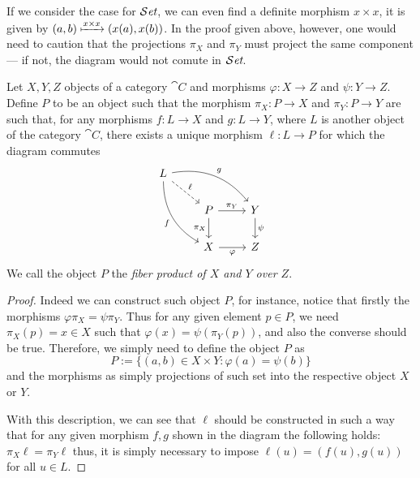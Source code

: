 If we consider the case for \({\mathcal{S}\textit{et}}\), we can even find a definite morphism \(x
\times x\), it is given by \((a, b) \xmapsto{x \times x} (x(a), x(b))\). In the
proof given above, however, one would need to caution that the projections
\(\pi_X\) and \(\pi_Y\) must project the same component --- if not, the diagram
would not comute in \({\mathcal{S}\textit{et}}\).

\begin{proposition}
   Let \(X, Y, Z\) objects of a category \(\cat C\) and morphisms \(\varphi :X
   \to Z\) and \(\psi : Y \to Z\). Define \(P\) to be an object such that the
   morphism  \(\pi_X : P \to X\) and  \(\pi_Y : P \to Y\) are such that, for any
   morphisms \(f : L \to X\) and  \(g : L \to Y\), where \(L\) is another object
   of the category \(\cat C\), there exists a unique morphism \(\ell: L \to P\)
   for which the diagram commutes
   \[
     \begin{tikzcd}
       L
       \ar[dr, dashed, "\ell"]
       \ar[drr, bend left, "g"]
       \ar[ddr, bend right, swap, "f"]
        &
          & \\
        &P
        \ar[r, "\pi_Y"]
        \ar[d, swap, "\pi_X"]
          &Y
          \ar[d, "\psi"]
          \\
        &X
        \ar[r, swap, "\varphi"]
          &Z
     \end{tikzcd}
   \]
   We call the object \(P\) the \emph{fiber product of \(X\) and \(Y\) over
   \(Z\)}.
\end{proposition}

\begin{proof}
   Indeed we can construct such object \(P\), for instance, notice that firstly
   the morphisms \(\varphi  \pi_X = \psi  \pi_Y\). Thus for any
   given element \(p \in P\), we need \(\pi_X(p) = x \in X\) such that
   \(\varphi(x) = \psi(\pi_Y(p))\), and also the converse should be true.
   Therefore, we simply need to define the object \(P\) as
   \[
      P := \{(a, b) \in X \times Y : \varphi(a) = \psi(b)\}
   \]
   and the morphisms as simply projections of such set into the respective
   object \(X\) or \(Y\).

   With this description, we can see that \(\ell\) should be constructed in such
   a way that for any given morphism \(f, g\) shown in the diagram the following
   holds: \(\pi_X  \ell = \pi_Y  \ell\) thus, it is simply necessary
   to impose \(\ell(u) = (f(u), g(u))\) for all \(u \in L\).
\end{proof}

